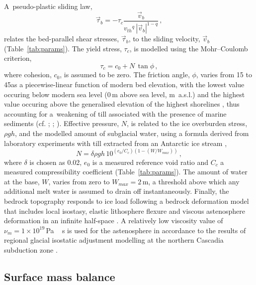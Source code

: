 \documentclass[tc]{copernicus}
\begin{document}
A~pseudo-plastic sliding law,
\begin{equation}
    \label{eqn:pseudoplastic}
    \vec{\tau}_b = -\tau_c \frac{\vec{v}_b}{{v_{th}}^q\,|\vec{v}_b|^{1-q}} \,,
\end{equation}
relates the bed-parallel shear stresses, $\vec{\tau}_b$, to the sliding
velocity, $\vec{v}_b$ (Table~\ref{tab:params}).
The yield stress, $\tau_c$,
is modelled using the Mohr--Coulomb criterion,
\begin{equation}
   \tau_c = c_0 + N\,\tan{\phi} \,,
\end{equation}
where cohesion, $c_0$, is assumed to be zero. The friction angle, $\phi$,
varies from 15 to 45\degree as a piecewise-linear function of modern bed
elevation, with the lowest value occuring below modern sea level (0\,m above
sea level, m~a.s.l.) and the highest value occuring above the generalised
elevation of the highest shorelines
\citep[200\,m~a.s.l.,][Fig.~5]{Clague.1981}, thus accounting for
a~weakening of till associated with the presence of marine sediments
(cf. \citealp{Martin.etal.2011}; \citealp[supplement]{Aschwanden.etal.2013};
\citealp{PISM-authors.2015}). Effective pressure, $N$,
is related to the ice overburden stress, $\rho gh$, and the modelled amount of
subglacial water, using a formula derived from laboratory experiments with till
extracted from an Antarctic ice stream \citep{Tulaczyk.etal.2000,
Bueler.Pelt.2014},
\begin{equation}
    N = \delta \rho gh \, 10^{(e_0/C_c) (1 - (W/W_{max}))} \,,
\end{equation}
where $\delta$ is chosen as 0.02, $e_0$ is a measured reference void ratio and
$C_c$ a measured compressibility coefficient (Table~\ref{tab:params}). The
amount of water at the base, $W$, varies from zero to $W_{max}=2$\,m, a
threshold above which any additional melt water is assumed to drain off
instantaneously. Finally, the bedrock topography responds to ice load
following a bedrock deformation model that includes local isostasy,
elastic lithosphere flexure and viscous astenosphere deformation in an infinite
half-space
\citep[Table~\ref{tab:params};][]{Lingle.Clark.1985,Bueler.etal.2007}.
A relatively low viscosity value of $\nu_m = 1\times10^{19}$\,\unit{Pa\,s} is
used for the astenosphere in accordance to the results of regional glacial
isostatic adjustment modelling at the northern Cascadia subduction zone
\citep{James.etal.2009}.

\subsection{Surface mass balance}
\label{sec:surface}
\end{document}
